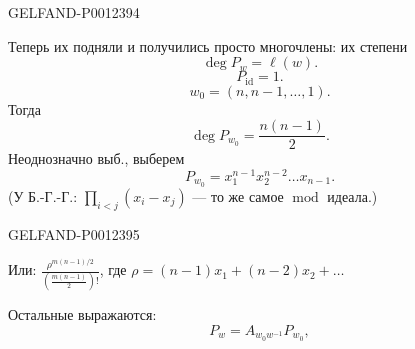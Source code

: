 \begin{GelfandAdjacentEvidence}{GELFAND-P001239}{4}

Теперь их подняли и получились просто многочлены: их степени
\begin{equation*}
\operatorname{deg} P_w=\ell(w).
\end{equation*}
\begin{equation*}
P_{\mathrm{id}}=1.
\end{equation*}
\begin{equation*}
w_0=(n,n-1,\ldots,1).
\end{equation*}
Тогда
\begin{equation*}
\operatorname{deg} P_{w_0}=\frac{n(n-1)}{2}.
\end{equation*}
Неоднозначно выб., выберем
\begin{equation*}
P_{w_0}=x_1^{n-1}x_2^{n-2}\ldots x_{n-1}.
\end{equation*}
(У Б.-Г.-Г.: $\displaystyle\prod_{i<j}(x_i-x_j)$ — то же самое $\operatorname{mod}$ идеала.)
\end{GelfandAdjacentEvidence}
\begin{GelfandAdjacentEvidence}{GELFAND-P001239}{5}


Или: $\displaystyle\frac{\rho^{m(n-1)/2}}{\left(\frac{m(n-1)}{2}\right)!}$, где $\rho=(n-1)x_1+(n-2)x_2+\ldots$
\end{GelfandAdjacentEvidence}


Остальные выражаются:
\begin{equation*}
P_w=A_{w_0w^{-1}}P_{w_0},
\end{equation*}


